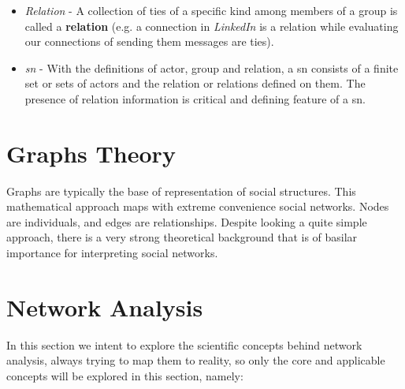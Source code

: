 \begin{itemize}
    \item \emph{Relation} - A collection of ties of a specific kind among members of a group is called a \textbf{relation} (e.g. a connection in \textit{LinkedIn} is a relation while evaluating our connections of sending them messages are ties).
    \item \emph{\gls{sn}} - With the definitions of actor, group and relation, a \gls{sn} consists of a finite set or sets of actors and the relation or relations defined on them. The presence of relation information is critical and defining feature of a \gls{sn}.
\end{itemize}

\section{Graphs Theory}
Graphs are typically the base of representation of social structures. This mathematical approach maps with  extreme convenience social networks. Nodes are individuals, and edges are relationships. Despite looking a quite simple approach, there is a very strong theoretical background that is of basilar importance for interpreting social networks.


\section{Network Analysis}
In this section we intent to explore the scientific concepts behind network analysis, always trying to map them to reality, so only the core
and applicable concepts will be explored in this section, namely:

